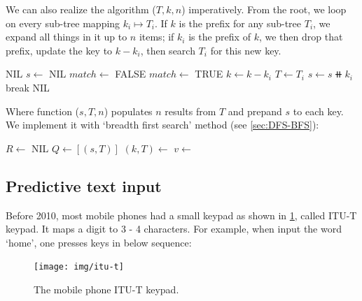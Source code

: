 \documentclass[b5paper]{article}
\begin{document}
We can also realize the algorithm ($T, k, n$) imperatively. From the root, we loop on every sub-tree mapping $k_i \mapsto T_i$. If $k$ is the prefix for any sub-tree $T_i$, we expand all things in it up to $n$ items; if $k_i$ is the prefix of $k$, we then drop that prefix, update the key to $k - k_i$, then search $T_i$ for this new key.

\begin{algorithmic}[1]
     \State \Return NIL
  \EndIf
  \State $s \gets$ NIL
  \Repeat
    \State $match \gets$ FALSE
        \State \Return {}
      \EndIf
        \State $match \gets$ TRUE
        \State $k \gets k - k_i$  
        \State $T \gets T_i$
        \State $s \gets s \doubleplus k_i$
        \State break
      \EndIf
    \EndFor
  \State \Return NIL
\EndFunction
\end{algorithmic}

Where function ($s, T, n$) populates $n$ results from $T$ and prepand $s$ to each key. We implement it with `breadth first search' method (see \cref{sec:DFS-BFS}):

\begin{algorithmic}[1]
  \State $R \gets $ NIL
  \State $Q \gets [(s, T)]$
    \State $(k, T) \gets$ 
    \State $v \gets$ 
      \State {}
    \EndIf
      \State {}
    \EndFor
  \EndWhile
\EndFunction
\end{algorithmic}

\subsection{Predictive text input}

Before 2010, most mobile phones had a small keypad as shown in \cref{fig:itut-keypad}, called ITU-T keypad. It maps a digit to 3 - 4 characters. For example, when input the word `home', one presses keys in below sequence:

\begin{figure}[htbp]
  \centering
  \texttt{[image: img/itu-t]}
  \caption{The mobile phone ITU-T keypad.}
  \label{fig:itut-keypad}
\end{figure}
\end{document}

